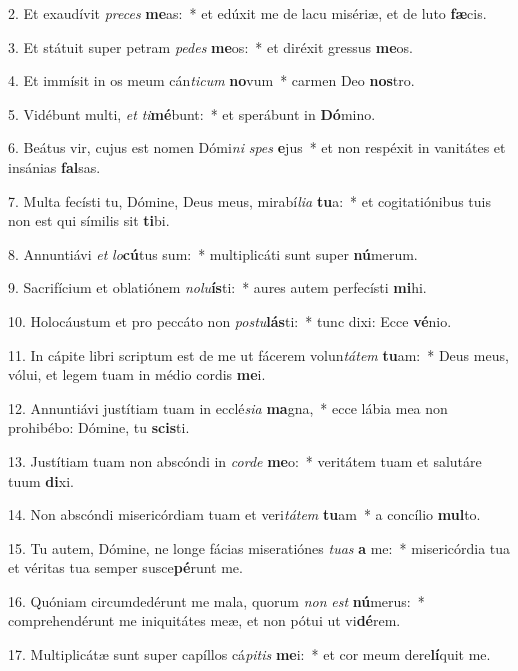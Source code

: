2. Et exaudívit \textit{pre}\textit{ces} \textbf{me}as:~*  et edúxit me de lacu misériæ, et de luto \textbf{fæ}cis.\

3. Et státuit super petram \textit{pe}\textit{des} \textbf{me}os:~*  et diréxit gressus \textbf{me}os.\

4. Et immísit in os meum cán\textit{ti}\textit{cum} \textbf{no}vum~*  carmen Deo \textbf{nos}tro.\

5. Vidébunt multi, \textit{et} \textit{ti}\textbf{mé}bunt:~*  et sperábunt in \textbf{Dó}mino.\

6. Beátus vir, cujus est nomen Dómi\textit{ni} \textit{spes} \textbf{e}jus~*  et non respéxit in vanitátes et insánias \textbf{fal}sas.\

7. Multa fecísti tu, Dómine, Deus meus, mirabí\textit{li}\textit{a} \textbf{tu}a:~*  et cogitatiónibus tuis non est qui símilis sit \textbf{ti}bi.\

8. Annuntiávi \textit{et} \textit{lo}\textbf{cú}tus sum:~*  multiplicáti sunt super \textbf{nú}merum.\

9. Sacrifícium et oblatiónem \textit{no}\textit{lu}\textbf{ís}ti:~*  aures autem perfecísti \textbf{mi}hi.\

10. Holocáustum et pro peccáto non \textit{pos}\textit{tu}\textbf{lás}ti:~*  tunc dixi: Ecce \textbf{vé}nio.\

11. In cápite libri scriptum est de me ut fácerem volun\textit{tá}\textit{tem} \textbf{tu}am:~*  Deus meus, vólui, et legem tuam in médio cordis \textbf{me}i.\

12. Annuntiávi justítiam tuam in ecclé\textit{si}\textit{a} \textbf{ma}gna,~*  ecce lábia mea non prohibébo: Dómine, tu \textbf{scis}ti.\

13. Justítiam tuam non abscóndi in \textit{cor}\textit{de} \textbf{me}o:~*  veritátem tuam et salutáre tuum \textbf{di}xi.\

14. Non abscóndi misericórdiam tuam et veri\textit{tá}\textit{tem} \textbf{tu}am~*  a concílio \textbf{mul}to.\

15. Tu autem, Dómine, ne longe fácias miseratiónes \textit{tu}\textit{as} \textbf{a} me:~*  misericórdia tua et véritas tua semper susce\textbf{pé}runt me.\

16. Quóniam circumdedérunt me mala, quorum \textit{non} \textit{est} \textbf{nú}merus:~*  comprehendérunt me iniquitátes meæ, et non pótui ut vi\textbf{dé}rem.\

17. Multiplicátæ sunt super capíllos cá\textit{pi}\textit{tis} \textbf{me}i:~*  et cor meum dere\textbf{lí}quit me.\

